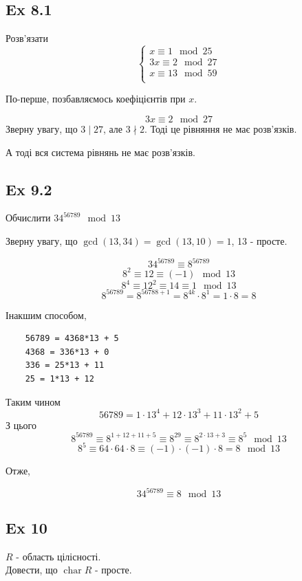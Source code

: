\documentclass[11pt, a4paper]{article} %
\DeclareMathOperator{\ch}{char}
\begin{document}
\newpage
\subsection*{Ex 8.1}
\begin{mdframed}
    Розв'язати
    \[\begin{cases}
        x \equiv 1 \mod 25\\
        3x \equiv 2 \mod 27\\
        x \equiv 13 \mod 59\\
    \end{cases}\]
\end{mdframed}

По-перше, позбавляємось коефіцієнтів при $x$.

$$3x \equiv 2 \mod 27$$
Зверну увагу, що $3\mid 27$, але $3\nmid 2$. Тоді це рівняння не має розв'язків.

А тоді вся система рівнянь не має розв'язків.

\subsection*{Ex 9.2}
\begin{mdframed}
    Обчислити $34^{56789} \mod 13$
\end{mdframed}

Зверну увагу, що $\gcd(13,34)=\gcd(13,10)=1$, 13 - просте.

\[34^{56789} \equiv 8^{56789}\]
\[8^2 \equiv 12 \equiv (-1) \mod 13\]
\[8^4 \equiv 12^2 \equiv 14 \equiv 1 \mod 13\]
\[8^{56789} = 8^{56788+1} = 8^{4k}\cdot 8^1 = 1\cdot 8 = 8\]

Інакшим способом,

\begin{lstlisting}
    56789 = 4368*13 + 5
    4368 = 336*13 + 0
    336 = 25*13 + 11
    25 = 1*13 + 12
\end{lstlisting}
Таким чином
\[56789 = 1\cdot 13^4 + 12\cdot 13^3 + 11\cdot 13^2 + 5\]
З цього
\[8^{56789} \equiv 8^{1+12+11+5} \equiv 8^{29} \equiv 8^{2\cdot 13 + 3} \equiv 8^{5} \mod 13\]
\[8^{5} \equiv 64\cdot 64 \cdot 8 \equiv (-1) \cdot (-1) \cdot 8 = 8 \mod 13\]

Отже,
\begin{mdframed}[backgroundcolor=yellow!20]
    $$34^{56789} \equiv 8 \mod 13$$
\end{mdframed}

\newpage
\subsection*{Ex 10}
\begin{mdframed}
    $R$ - область цілісності.\\
    Довести, що $\ch R$ - просте.
\end{mdframed}
\end{document}
